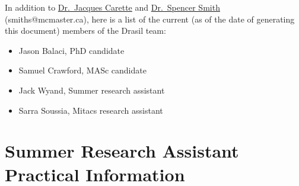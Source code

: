 \documentclass[12pt]{article}
\begin{document}
In addition to \href{https://www.cas.mcmaster.ca/~carette/} {Dr.\ Jacques
Carette} and \href{https://www.cas.mcmaster.ca/~smiths/} {Dr.\ Spencer Smith}
(smiths@mcmaster.ca), here is a list of the current (as of the date of
generating this document) members of the Drasil team:

\begin{itemize}
\item Jason Balaci, PhD candidate
\item Samuel Crawford, MASc candidate
\item Jack Wyand, Summer research assistant
\item Sarra Soussia, Mitacs research assistant
\end{itemize}

\section{Summer Research Assistant Practical Information} \label{SecPractInfo}
\end{document}
